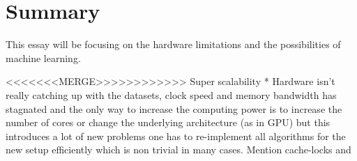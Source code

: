 \documentclass{article}
\begin{document}

\section{Summary} %
    This essay will be focusing on the hardware limitations
    and the possibilities of machine learning.

%   
%      
%
%   
%
%
%
%
%
%
<<<<<<<MERGE>>>>>>>>>>>>
    Super scalability
    * Hardware isn't really catching up with the datasets, clock speed and
    memory bandwidth has
    stagnated and the only way to increase the computing power is to increase
    the number of cores or change the underlying architecture (as in GPU) but 
    this introduces a lot of new problems one has to re-implement all
    algorithms for the new setup efficiently which is non trivial in many
    cases. Mention cache-locks and
\end{document}

